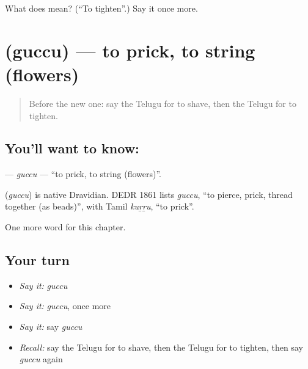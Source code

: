 \begin{tcolorbox}[breakable,colback=teal!4,colframe=teal!35!black,title={Before you move on}]
What does  mean? (\textquotedblleft{}To tighten\textquotedblright{}.) Say it once more.
\end{tcolorbox}
\section[\texorpdfstring{\te{గుచ్చు} (guccu)}{గుచ్చు (guccu)}]{ (guccu) — to prick, to string (flowers)}

\label{lesson:TE-C165-guccu}



\begin{quote}
Before the new one: say the Telugu for to shave, then the Telugu for to tighten.
\end{quote}

\subsection*{You'll want to know: }
\textbf{} — \emph{guccu} — \textquotedblleft{}to prick, to string (flowers)\textquotedblright{}.

\begin{cousinweb}
\textbf{} (\emph{guccu}) is native Dravidian. DEDR 1861 lists \emph{guccu}, \textquotedblleft{}to pierce, prick, thread together (as beads)\textquotedblright{}, with Tamil \emph{kuṟṟu}, \textquotedblleft{}to prick\textquotedblright{}.
\end{cousinweb}

\begin{grammarlens}[title={What you've built}]
One more word for this chapter.
\end{grammarlens}

\subsection*{Your turn}
\begin{itemize}
\raggedright
  \item \emph{Say it:} \emph{guccu}
  \item \emph{Say it:} \emph{guccu}, once more
  \item \emph{Say it:} say \emph{guccu}
  \item \emph{Recall:} say the Telugu for to shave, then the Telugu for to tighten, then say \emph{guccu} again
\end{itemize}

